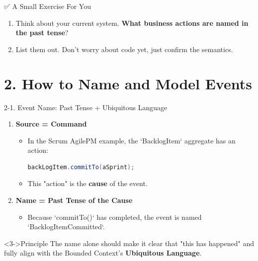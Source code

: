 \documentclass{beamer}
\begin{document}
\begin{frame}{✅ A Small Exercise For You}
  \begin{enumerate}
    \item Think about your current system. \textbf{What business actions are named in the past tense}?
    \item List them out. Don't worry about code yet, just confirm the semantics.
  \end{enumerate}
\end{frame}


\section{2. How to Name and Model Events}

\begin{frame}[fragile]{2-1. Event Name: Past Tense + Ubiquitous Language}
  \begin{enumerate}
    \item \textbf{Source = Command}
      \begin{itemize}
        \item In the Scrum AgilePM example, the `BacklogItem` aggregate has an action:
        \begin{lstlisting}[language=Java]
backLogItem.commitTo(aSprint);
        \end{lstlisting}
        \item This "action" is the \textbf{cause} of the event.
      \end{itemize}
    \item<2-> \textbf{Name = Past Tense of the Cause}
      \begin{itemize}
        \item Because `commitTo()` has completed, the event is named `BacklogItemCommitted`.
      \end{itemize}
  \end{enumerate}
  \begin{alertblock}<3->{Principle}
    The name alone should make it clear that "this has happened" and fully align with the Bounded Context's \textbf{Ubiquitous Language}.
  \end{alertblock}
\end{frame}
\end{document}

